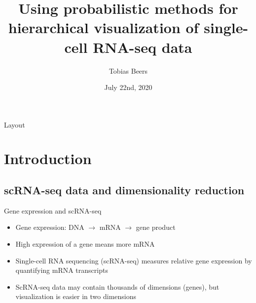 \documentclass{beamer}
\title[Hierarchical visualization of scRNA-seq data]{Using probabilistic methods for hierarchical visualization of single-cell RNA-seq data}
\author{Tobias Beers}
\institute{Universiteit van Amsterdam}
\date{July 22nd, 2020}
\begin{document}


\frame{\titlepage}

\begin{frame}{Layout}
    \tableofcontents
\end{frame}

\section{Introduction}

\subsection{scRNA-seq data and dimensionality reduction}

\begin{frame}{Gene expression and scRNA-seq}
\begin{itemize}
    \item Gene expression: DNA $\rightarrow$ mRNA $\rightarrow$ gene product
    \item High expression of a gene means more mRNA
    \item Single-cell RNA sequencing (scRNA-seq) measures relative gene expression by quantifying mRNA transcripts
    \item ScRNA-seq data may contain thousands of dimensions (genes), but visualization is easier in two dimensions
\end{itemize}
\end{frame}

\end{document}
